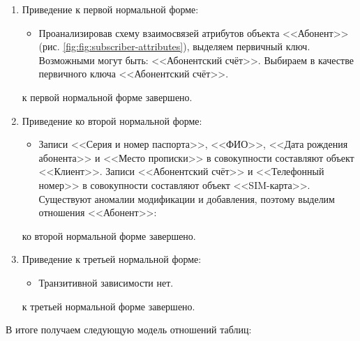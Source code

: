 \begin{enumerate}
    \item Приведение к первой нормальной форме:
    \begin{itemize}
        \item Проанализировав схему взаимосвязей атрибутов объекта <<Абонент>> (рис. \ref{fig:fig:subscriber-attributes}), выделяем первичный ключ. Возможными могут быть: <<Абонентский счёт>>. Выбираем в качестве первичного ключа <<Абонентский счёт>>.
    \end{itemize}
    \tab{} к первой нормальной форме завершено.

    \item Приведение ко второй нормальной форме:
    \begin{itemize}
        \item Записи <<Серия и номер паспорта>>, <<ФИО>>, <<Дата рождения абонента>> и <<Место прописки>> в совокупности составляют объект <<Клиент>>. Записи <<Абонентский счёт>> и <<Телефонный номер>> в совокупности составляют объект <<SIM-карта>>. Существуют аномалии модификации и добавления, поэтому выделим отношения <<Абонент>>:
    \end{itemize}
    \tab{} ко второй нормальной форме завершено.

    \item Приведение к третьей нормальной форме:
    \begin{itemize}
        \item Транзитивной зависимости нет.
    \end{itemize}
    \tab{} к третьей нормальной форме завершено.
\end{enumerate}


В итоге получаем следующую модель отношений таблиц:
